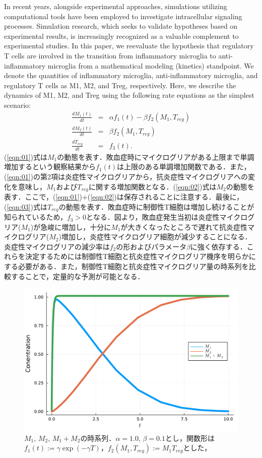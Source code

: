 \documentclass{jsarticle}
\begin{document}
In recent years, alongside experimental approaches, simulations utilizing computational tools have been employed to investigate intracellular signaling processes. Simulation research, which seeks to validate hypotheses based on experimental results, is increasingly recognized as a valuable complement to experimental studies. In this paper, we reevaluate the hypothesis that regulatory T cells are involved in the transition from inflammatory microglia to anti-inflammatory microglia from a mathematical modeling (kinetics) standpoint. 
We denote the quantities of inflammatory microglia, anti-inflammatory microglia, and regulatory T cells as M1, M2, and Treg, respectively. Here, we describe the dynamics of M1, M2, and Treg using the following rate equations as the simplest scenario:
\begin{eqnarray}
  \label{eqn:01}
  \frac{dM_{1}(t)}{dt} &=& \alpha f_1(t)- \beta f_2(M_1, T_{reg}) \\
  \label{eqn:02}
  \frac{dM_2(t)}{dt} &=& \beta f_2(M_1, T_{reg}) \\
  \label{eqn:03}
  \frac{dT_{reg}}{dt} &=& f_3(t).
\end{eqnarray}
(\ref{eqn:01})式は$M_1$の動態を表す．敗血症時にマイクログリアがある上限まで単調増加するという観察結果から$f_1(t)$は上限のある単調増加関数である．また，(\ref{eqn:01})の第2項は炎症性マイクログリアから，抗炎症性マイクログリアへの変化を意味し，$M_1$および$T_{reg}$に関する増加関数となる．(\ref{eqn:02})式は$M_2$の動態を表す．ここで，(\ref{eqn:01})$+$(\ref{eqn:02})は保存されることに注意する．最後に，(\ref{eqn:03})式は$T_{reg}$の動態を表す．敗血症時に制御性T細胞は増加し続けることが知られているため，$f_3>0$となる．図より，敗血症発生当初は炎症性マイクログリア($M_1$)が急峻に増加し，十分に$M_1$が大きくなったところで遅れて抗炎症性マイクログリア($M_2$)増加し，炎症性マイクログリア細胞が減少することになる．炎症性マイクログリアの減少率は$f_2$の形およびパラメータ$\beta$に強く依存する．これらを決定するためには制御性T細胞と抗炎症性マイクログリア機序を明らかにする必要がある．また，制御性T細胞と抗炎症性マイクログリア量の時系列を比較することで，定量的な予測が可能となる．

\begin{figure}[h]
  \centering
    \includegraphics[width=12cm,clip]{../fig/masafig01.pdf}
        \caption{$M_1$, $M_2$, $M_1+M_2$の時系列．$\alpha=1.0$, $\beta=0.1$とし，関数形は$f_1(t):= \gamma\exp{(-\gamma T)}$，$f_2(M_1, T_{reg}):=M_1T_{reg}$とした，}
      \label{fig:01}
  \end{figure}
\end{document}

